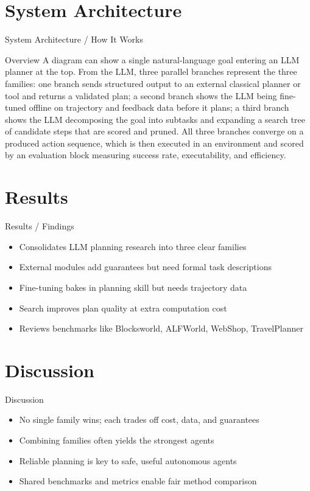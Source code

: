 \documentclass[10pt]{beamer}
\begin{document}
\section{System Architecture}
\begin{frame}{System Architecture / How It Works}
  \begin{block}{Overview}
  A diagram can show a single natural-language goal entering an LLM planner at the top. From the LLM, three parallel branches represent the three families: one branch sends structured output to an external classical planner or tool and returns a validated plan; a second branch shows the LLM being fine-tuned offline on trajectory and feedback data before it plans; a third branch shows the LLM decomposing the goal into subtasks and expanding a search tree of candidate steps that are scored and pruned. All three branches converge on a produced action sequence, which is then executed in an environment and scored by an evaluation block measuring success rate, executability, and efficiency.
  \end{block}
\end{frame}

\section{Results}
\begin{frame}[allowframebreaks]{Results / Findings}
\begin{itemize}
  \item Consolidates LLM planning research into three clear families
  \item External modules add guarantees but need formal task descriptions
  \item Fine-tuning bakes in planning skill but needs trajectory data
  \item Search improves plan quality at extra computation cost
  \item Reviews benchmarks like Blocksworld, ALFWorld, WebShop, TravelPlanner
\end{itemize}
\end{frame}

\section{Discussion}
\begin{frame}{Discussion}
\begin{itemize}
  \item No single family wins; each trades off cost, data, and guarantees
  \item Combining families often yields the strongest agents
  \item Reliable planning is key to safe, useful autonomous agents
  \item Shared benchmarks and metrics enable fair method comparison
\end{itemize}
\end{frame}
\end{document}
